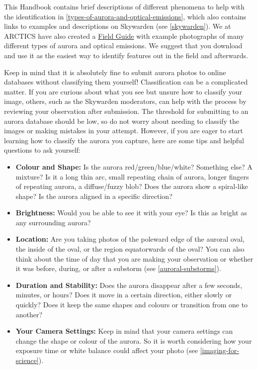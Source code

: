 \documentclass{article}
\begin{document}
This Handbook contains brief descriptions of different phenomena to help with the identification in \ref{types-of-aurora-and-optical-emissions}, which also contains links to examples and descriptions on Skywarden (see \ref{skywarden}). We at ARCTICS have also created a \href{https://kherli.github.io/Aurora-Field-Guide-And-Handbook/_static/Aurora_Field_Guide.pdf}{Field Guide} with example photographs of many different types of aurora and optical emissions. We suggest that you download and use it as the easiest way to identify features out in the field and afterwards.

Keep in mind that it is absolutely fine to submit aurora photos to online databases without classifying them yourself! Classification can be a complicated matter. If you are curious about what you see but unsure how to classify your image, others, such as the Skywarden moderators, can help with the process by reviewing your observation after submission. The threshold for submitting to an aurora database should be low, so do not worry about needing to classify the images or making mistakes in your attempt. However, if you are eager to start learning how to classify the aurora you capture, here are some tips and helpful questions to ask yourself:
\begin{itemize}
    \item \textbf{Colour and Shape:} Is the aurora red/green/blue/white? Something else? A mixture? Is it a long thin arc, small repeating chain of aurora, longer fingers of repeating aurora, a diffuse/fuzzy blob? Does the aurora show a spiral-like shape? Is the aurora aligned in a specific direction?
    \item \textbf{Brightness:} Would you be able to see it with your eye? Is this as bright as any surrounding aurora?
    \item \textbf{Location:} Are you taking photos of the poleward edge of the auroral oval, the inside of the oval, or the region equatorwards of the oval? You can also think about the time of day that you are making your observation or whether it was before, during, or after a substorm (see \ref{auroral-substorms}).
    \item \textbf{Duration and Stability:} Does the aurora disappear after a few seconds, minutes, or hours? Does it move in a certain direction, either slowly or quickly? Does it keep the same shapes and colours or transition from one to another?
    \item \textbf{Your Camera Settings:} Keep in mind that your camera settings can change the shape or colour of the aurora. So it is worth considering how your exposure time or white balance could affect your photo (see \ref{imaging-for-science}).
\end{itemize}
\end{document}
